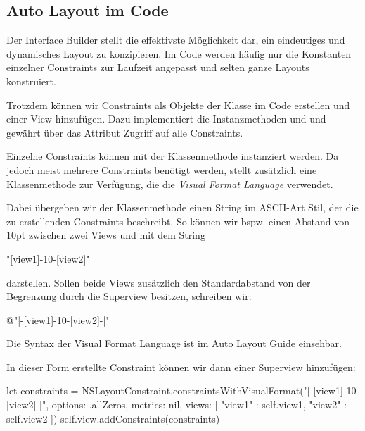 \documentclass[parskip=half, final]{scrreprt}
\begin{document}
\subsection{Auto Layout im Code}

Der Interface Builder stellt die effektivste Möglichkeit dar, ein eindeutiges und dynamisches Layout zu konzipieren. Im Code werden häufig nur die Konstanten einzelner Constraints zur Laufzeit angepasst und selten ganze Layouts konstruiert.

Trotzdem können wir Constraints als Objekte der  Klasse im Code erstellen und einer View hinzufügen. Dazu implementiert  die Instanzmethoden  und  und gewährt über das Attribut  Zugriff auf alle Constraints.

Einzelne Constraints können mit der Klassenmethode  instanziert werden. Da jedoch meist mehrere Constraints benötigt werden, stellt  zusätzlich eine Klassenmethode  zur Verfügung, die die \emph{Visual Format Language} verwendet.

Dabei übergeben wir der Klassenmethode einen String im ASCII-Art Stil, der die zu erstellenden Constraints beschreibt. So können wir bspw. einen Abstand von 10pt zwischen zwei Views  und  mit dem String
\begin{swiftcode}
"[view1]-10-[view2]"
\end{swiftcode}
darstellen. Sollen beide Views zusätzlich den Standardabstand von der Begrenzung durch die Superview besitzen, schreiben wir:
\begin{swiftcode}
@"|-[view1]-10-[view2]-|"
\end{swiftcode}

Die Syntax der Visual Format Language ist im Auto Layout Guide einsehbar.

In dieser Form erstellte Constraint können wir dann einer Superview hinzufügen:
\begin{swiftcode}
let constraints = NSLayoutConstraint.constraintsWithVisualFormat("|-[view1]-10-[view2]-|", options: .allZeros, metrics: nil, views: [ "view1" : self.view1, "view2" : self.view2 ])
self.view.addConstraints(constraints)
\end{swiftcode}
\end{document}
